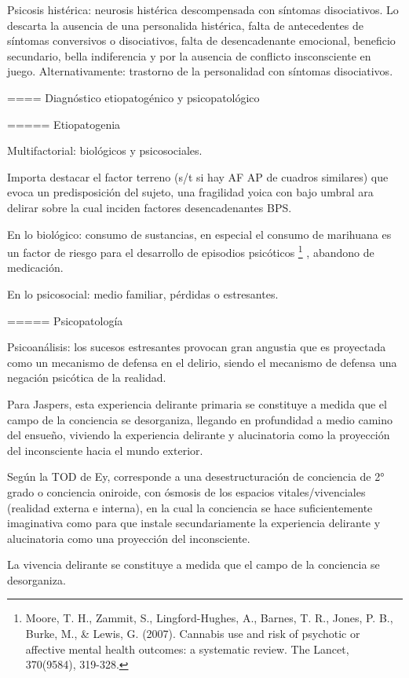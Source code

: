 Psicosis histérica: neurosis histérica descompensada con síntomas disociativos. Lo descarta la ausencia de una personalida histérica, falta de antecedentes de síntomas conversivos o disociativos, falta de desencadenante emocional, beneficio secundario, bella indiferencia y por la ausencia de conflicto insconsciente en juego. Alternativamente: trastorno de la personalidad con síntomas disociativos.

==== Diagnóstico etiopatogénico y psicopatológico

===== Etiopatogenia

Multifactorial: biológicos y psicosociales.

Importa destacar el factor terreno (s/t si hay AF AP de cuadros similares) que evoca un predisposición del sujeto, una fragilidad yoica con bajo umbral ara delirar sobre la cual inciden factores desencadenantes BPS.

En lo biológico: consumo de sustancias, en especial el consumo de marihuana es un factor de riesgo para el desarrollo de episodios psicóticos \footnote{Moore, T. H., Zammit, S., Lingford-Hughes, A., Barnes, T. R., Jones, P. B., Burke, M., \& Lewis, G. (2007). Cannabis use and risk of psychotic or affective mental health outcomes: a systematic review. The Lancet, 370(9584), 319-328.} , abandono de medicación.

En lo psicosocial: medio familiar, pérdidas o estresantes.

===== Psicopatología

Psicoanálisis: los sucesos estresantes provocan gran angustia que es proyectada como un mecanismo de defensa en el delirio, siendo el mecanismo de defensa una negación psicótica de la realidad.

Para Jaspers, esta experiencia delirante primaria se constituye a medida que el campo de la conciencia se desorganiza, llegando en profundidad a medio camino del ensueño, viviendo la experiencia delirante y alucinatoria como la proyección del inconsciente hacia el mundo exterior.

Según la TOD de Ey, corresponde a una desestructuración de conciencia de 2° grado o conciencia oniroide, con ósmosis de los espacios vitales/vivenciales (realidad externa e interna), en la cual la conciencia se hace suficientemente imaginativa como para que instale secundariamente la experiencia delirante y alucinatoria como una proyección del inconsciente.

La vivencia delirante se constituye a medida que el campo de la conciencia se desorganiza.


